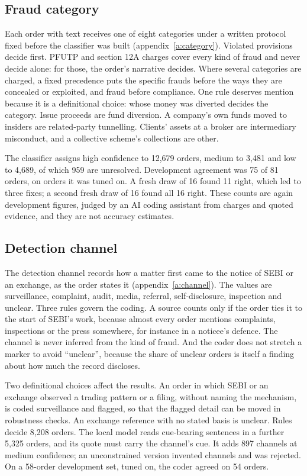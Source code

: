 \documentclass[letterpaper,11pt,leqno]{article}
\begin{document}
\subsection{Fraud category}\label{s:category}

Each order with text receives one of eight categories under a written protocol fixed before the classifier was built (appendix~\ref{a:category}). Violated provisions decide first. PFUTP and section 12A charges cover every kind of fraud and never decide alone: for those, the order's narrative decides. Where several categories are charged, a fixed precedence puts the specific frauds before the ways they are concealed or exploited, and fraud before compliance. One rule deserves mention because it is a definitional choice: whose money was diverted decides the category. Issue proceeds are fund diversion. A company's own funds moved to insiders are related-party tunnelling. Clients' assets at a broker are intermediary misconduct, and a collective scheme's collections are other.

The classifier assigns high confidence to 12,679 orders, medium to 3,481 and low to 4,689, of which 959 are unresolved. Development agreement was 75 of 81 orders, on orders it was tuned on. A fresh draw of 16 found 11 right, which led to three fixes; a second fresh draw of 16 found all 16 right. These counts are again development figures, judged by an AI coding assistant from charges and quoted evidence, and they are not accuracy estimates.

\subsection{Detection channel}\label{s:channel}

The detection channel records how a matter first came to the notice of SEBI or an exchange, as the order states it (appendix~\ref{a:channel}). The values are surveillance, complaint, audit, media, referral, self-disclosure, inspection and unclear. Three rules govern the coding. A source counts only if the order ties it to the start of SEBI's work, because almost every order mentions complaints, inspections or the press somewhere, for instance in a noticee's defence. The channel is never inferred from the kind of fraud. And the coder does not stretch a marker to avoid ``unclear'', because the share of unclear orders is itself a finding about how much the record discloses.

Two definitional choices affect the results. An order in which SEBI or an exchange observed a trading pattern or a filing, without naming the mechanism, is coded surveillance and flagged, so that the flagged detail can be moved in robustness checks. An exchange reference with no stated basis is unclear. Rules decide 8,208 orders. The local model reads cue-bearing sentences in a further 5,325 orders, and its quote must carry the channel's cue. It adds 897 channels at medium confidence; an unconstrained version invented channels and was rejected. On a 58-order development set, tuned on, the coder agreed on 54 orders.
\end{document}
